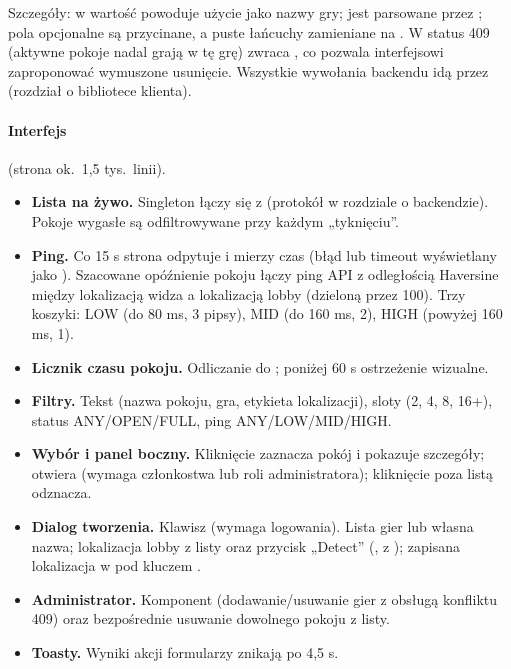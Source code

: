Szczegóły: w  wartość  powoduje użycie  jako
nazwy gry;  jest parsowane przez ; pola opcjonalne są
przycinane, a puste łańcuchy zamieniane na . W  status 409
(aktywne pokoje nadal grają w tę grę) zwraca ,
co pozwala interfejsowi zaproponować wymuszone usunięcie. Wszystkie wywołania backendu idą
przez  (rozdział o bibliotece klienta).

\paragraph{Interfejs} (strona ok.\ 1,5 tys.\ linii).
\begin{itemize}[nosep]
  \item \textbf{Lista na żywo.} Singleton  łączy się z 
        (protokół w rozdziale o backendzie). Pokoje wygasłe są odfiltrowywane przy każdym „tyknięciu”.
  \item \textbf{Ping.} Co 15 s strona odpytuje  i mierzy czas
        (błąd lub timeout wyświetlany jako ). Szacowane opóźnienie pokoju
        łączy ping API z odległością Haversine między lokalizacją widza a lokalizacją lobby
        (dzieloną przez 100). Trzy koszyki: LOW (do 80 ms, 3 pipsy), MID (do 160 ms, 2), HIGH
        (powyżej 160 ms, 1).
  \item \textbf{Licznik czasu pokoju.} Odliczanie  do ; poniżej 60 s
        ostrzeżenie wizualne.
  \item \textbf{Filtry.} Tekst (nazwa pokoju, gra, etykieta lokalizacji), sloty (2, 4, 8, 16+),
        status ANY/OPEN/FULL, ping ANY/LOW/MID/HIGH.
  \item \textbf{Wybór i panel boczny.} Kliknięcie zaznacza pokój i pokazuje szczegóły; 
        otwiera  (wymaga członkostwa lub roli administratora); kliknięcie poza listą
        odznacza.
  \item \textbf{Dialog tworzenia.} Klawisz  (wymaga logowania). Lista gier lub własna nazwa;
        lokalizacja lobby z listy oraz przycisk „Detect” (,
         z ); zapisana lokalizacja w
         pod kluczem .
  \item \textbf{Administrator.} Komponent  (dodawanie/usuwanie gier z obsługą konfliktu 409)
        oraz bezpośrednie usuwanie dowolnego pokoju z listy.
  \item \textbf{Toasty.} Wyniki akcji formularzy znikają po 4,5 s.
\end{itemize}

